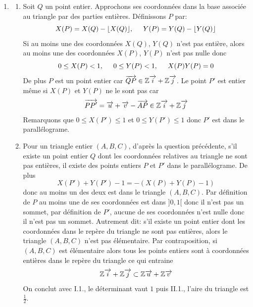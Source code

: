 \begin{enumerate}
 \item
 \begin{enumerate}
   \item Soit $Q$ un point entier. Approchons ses coordonnées dans la base associée au triangle par des parties entières. 
Définissons $P$ par:
\begin{displaymath}
  X(P) = X(Q) - \lfloor X(Q) \rfloor, \hspace{0.5cm} 
  Y(P) = Y(Q) - \lfloor Y(Q) \rfloor
\end{displaymath}
Si au moins une des coordonnées $X(Q)$, $Y(Q)$ n'est pas entière, alors au moins une des coordonnées $X(P)$, $Y(P)$ n'est pas nulle donc
   \begin{displaymath}
     0\leq X(P) < 1, \hspace{0.5cm} 0\leq Y(P) < 1 , \hspace{0.5cm} X(P)Y(P) = 0
   \end{displaymath}
De plus $P$ est un point entier car $\overrightarrow{QP} \in \mathbb{Z} \overrightarrow{i} +  \mathbb{Z} \overrightarrow{j}$.
Le point $P'$ est entier même si $X(P)$ et $Y(P)$ ne le sont pas car
\begin{displaymath}
  \overrightarrow{PP'} = \overrightarrow{u} + \overrightarrow{v} - \overrightarrow{AP} \in \mathbb{Z}\overrightarrow{i}+\mathbb{Z}\overrightarrow{j}
\end{displaymath}
Remarquons que $0\leq X(P') \leq1$ et $0\leq Y(P') \leq 1$ donc $P'$ est dans le parallélograme.
   \item Pour un triangle entier $(A,B,C)$, d'après la question précédente, s'il existe un point entier $Q$ dont les coordonnées relatives au triangle ne sont pas entières, il existe des points entiers $P$ et $P'$ dans le parallélograme. De plus
\begin{displaymath}
  X(P') + Y(P') - 1 = -\left( X(P) + Y(P) -1\right) 
\end{displaymath}
donc au moins un des deux est dans le triangle $(A,B,C)$. Par définition de $P$ au moins une de ses coordonnées est dans $]0,1[$ donc il n'est pas un sommet, par définition de $P'$, aucune de ses coordonnées n'est nulle donc il n'est pas un sommet.\newline
Autrement dit: s'il existe un point entier dont les coordonnées dans le repère du triangle ne sont pas entières, alors le triangle $(A,B,C)$ n'est pas élémentaire. Par contraposition, si $(A,B,C)$ est élémentaire alors tous les points entiers sont à coordonnées entières dans le repère du triangle ce qui entraine
\begin{displaymath}
  \mathbb{Z}\overrightarrow{i}+\mathbb{Z}\overrightarrow{j} \subset \mathbb{Z}\overrightarrow{u}+\mathbb{Z}\overrightarrow{v}
\end{displaymath}
On conclut avec I.1., le déterminant vaut $1$ puis II.1., l'aire du triangle est $\frac{1}{2}$.


 \end{enumerate}

\end{enumerate}

